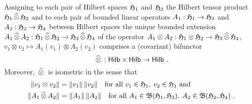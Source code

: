 \begin{proposition}
\label{thm:tensor-product-functor-category-hilbert-spaces-bounded-linear-operators}  
  Assigning to each pair of Hilbert spaces $\mathfrak{H}_1$ and $\mathfrak{H}_2$ the Hilbert tensor product
  $\mathfrak{H}_1 {\,\widehat{\otimes}\,}  \mathfrak{H}_2$
  and to each pair of bounded linear operators $A_1:\mathfrak{H}_1 \to \mathfrak{H}_3$ and  $A_2:\mathfrak{H}_2 \to \mathfrak{H}_4$
  between Hilbert spaces the unique bounded extension
  $A_1 {\,\widehat{\otimes}\,} A_2 : \mathfrak{H}_1 {\,\widehat{\otimes}\,} \mathfrak{H}_2 \to   \mathfrak{H}_3 {\,\widehat{\otimes}\,}  \mathfrak{H}_4$ of the operator
  $A_1 \otimes A_2 : \mathfrak{H}_1 \otimes \mathfrak{H}_2 \to   \mathfrak{H}_3 {\,\widehat{\otimes}\,}  \mathfrak{H}_4$,
  $v_1 \otimes v_2 \mapsto A_1(v_1) \otimes  A_2(v_2)$
  comprises a (covariant) bifunctor 
  \[ {\,\widehat{\otimes}\,} : \mathsf{Hilb} \times \mathsf{Hilb} \to \mathsf{Hilb} \ . \]
  Moreover, ${\,\widehat{\otimes}\,}$ is isometric in the sense that
  \begin{align}
    \label{eq:completed-tensor-product-isometry-equation-vectors}
    \| v_1 \otimes v_2\| & = \|v_1\| \, \|v_2\| \quad \text{for all } v_1\in \mathfrak{H}_1, \: v_2 \in \mathfrak{H}_1 \text{ and }\\
    \label{eq:completed-tensor-product-isometry-equation-bounded-linear-maps}
    \| A_1 {\,\widehat{\otimes}\,}     A_2\| & = \| A_1\| \, \|A_2\| \quad \text{for all }
       A_1\in \mathfrak{B} ( \mathfrak{H}_1, \mathfrak{H}_3 ), \: A_2\in \mathfrak{B} ( \mathfrak{H}_2, \mathfrak{H}_4 ) \ . 
  \end{align}
\end{proposition}

